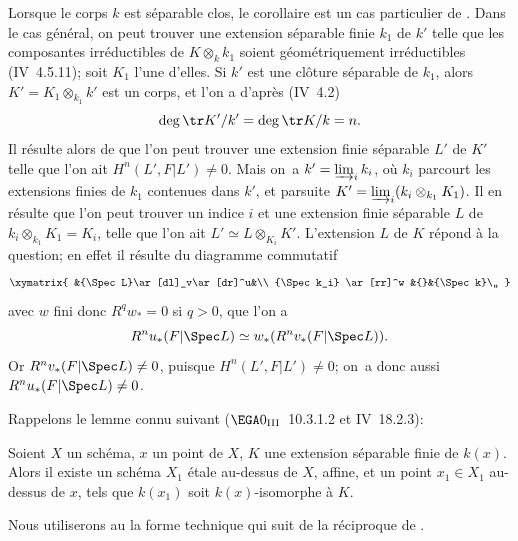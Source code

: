 Lorsque le corps $k$ est s\'eparable clos, le corollaire est un cas particulier de . Dans le cas g\'en\'eral, on peut trouver une extension s\'eparable finie $k_1$ de $k'$ telle que les composantes irr\'eductibles de $K \otimes_k k_1$ soient g\'eom\'etriquement irr\'eductibles (\EGA IV~4.5.11); soit $K_1$ l'une d'elles. Si $k'$ est une cl\^{o}ture s\'eparable de $k_1$, alors $K' = K_1 \otimes_{k_1} k'$ est un corps, et l'on a d'apr\`es (\EGA IV~4.2)
$$
\deg \tr K'/k' = \deg \tr K/k = n.
$$
Il r\'esulte alors de  que l'on peut trouver une extension finie s\'eparable $L'$ de $K'$ telle que l'on ait $H^n(L', F{|L'}) \neq 0$. Mais on~a $k' = \varinjlim_i k_i$, o\`u $k_i$ parcourt les extensions finies de $k_1$ contenues dans $k'$, et par\pageoriginale suite $K' = \varinjlim_i (k_i \otimes_{k_1} K_1)$. Il en r\'esulte que l'on peut trouver un indice $i$ et une extension finie s\'eparable $L$ de $k_i \otimes_{k_1} K_1 =K_i$, telle que l'on ait $L' \simeq L \otimes_{K_i} K'$. L'extension $L$ de $K$ r\'epond \`a la question; en effet il r\'esulte du diagramme commutatif
$$
\xymatrix{
&{\Spec L}\ar[dl]_v\ar[dr]^u&\\
{\Spec k_i} \ar[rr]^w &{}&{\Spec k}\,,
}
$$
avec $w$ fini donc $R^q w_* = 0$ si $q>0$, que l'on a
$$R^n u_*(F{|\Spec L}) \simeq w_*(R^n v_*(F{|\Spec L})).
$$
Or $R^nv_*(F{|\Spec L}) \neq 0$, puisque $H^n(L', F{|L'}) \neq 0$; on~a donc aussi $R^nu_*(F{|\Spec L}) \neq 0$.

Rappelons le lemme connu suivant (\cf $\EGA 0_{\textup{III}}$~10.3.1.2 et \EGA IV~18.2.3):

\begin{lemme} \label{XIV.3.4}
Soient $X$ un sch\'ema, $x$ un point de $X$, $K$ une extension s\'eparable finie de $k(x)$. Alors il existe un sch\'ema $X_1$ \'etale au-dessus de $X$, affine, et un point $x_1 \in X_1$ au-dessus de $x$, tels que $k(x_1)$ soit $k(x)$-isomorphe \`a $K$.
\end{lemme}

Nous utiliserons au \numero {} la forme technique qui suit de la r\'eciproque de .

